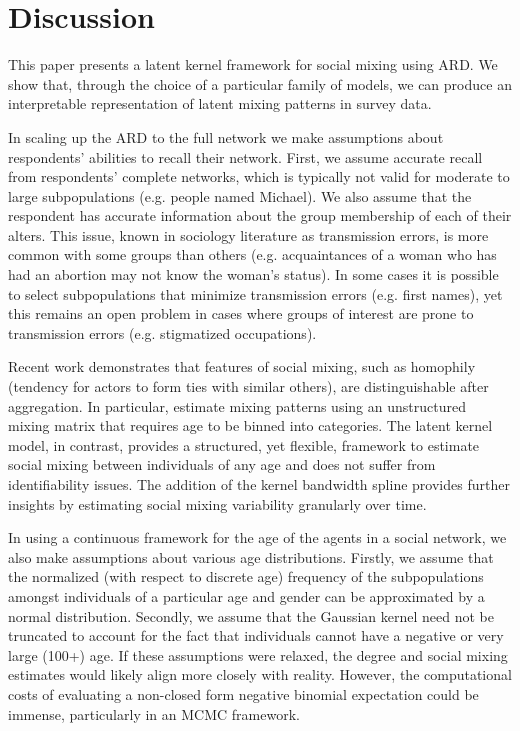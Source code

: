 \section{Discussion}
\label{sec:kernel_discussion}

This paper presents a latent kernel framework for social mixing using ARD. We show that, through the choice of a particular family of models, we can produce an interpretable representation of latent mixing patterns in survey data. 

In scaling up the ARD to the full network we make assumptions about respondents' abilities to recall their network. First, we assume accurate recall from respondents' complete networks, which is typically not valid for moderate to large subpopulations (e.g. people named Michael). We also assume that the respondent has accurate information about the group membership of each of their alters. This issue, known in sociology literature as transmission errors, is more common with some groups than others (e.g. acquaintances of a woman who has had an abortion may not know the woman's status). In some cases it is possible to select subpopulations that minimize transmission errors (e.g. first names), yet this remains an open problem in cases where groups of interest are prone to transmission errors (e.g. stigmatized occupations).

Recent work demonstrates that features of social mixing, such as homophily (tendency for actors to form ties with similar others), are distinguishable after aggregation. In particular, \citet{McCormick+others:2010} estimate mixing patterns using an unstructured mixing matrix that requires age to be binned into categories. The latent kernel model, in contrast, provides a structured, yet flexible, framework to estimate social mixing between individuals of any age and does not suffer from identifiability issues. The addition of the kernel bandwidth spline provides further insights by estimating social mixing variability granularly over time. 

In using a continuous framework for the age of the agents in a social network, we also make assumptions about various age distributions. Firstly, we assume that the normalized (with respect to discrete age) frequency of the subpopulations amongst individuals of a particular age and gender can be approximated by a normal distribution. Secondly, we assume that the Gaussian kernel need not be truncated to account for the fact that individuals cannot have a negative or very large (100+) age. If these assumptions were relaxed, the degree and social mixing estimates would likely align more closely with reality. However, the computational costs of evaluating a non-closed form negative binomial expectation could be immense, particularly in an MCMC framework. 

